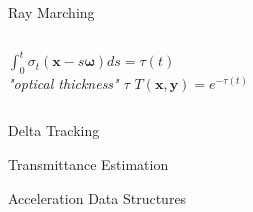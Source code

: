 \documentclass[
  english,            %
  aspectratio=169,    %
]{tumbeamer}
\newcommand\bx[0]{\textbf{x}}
\newcommand\by[0]{\textbf{y}}
\newcommand\bomega[0]{\boldsymbol{\omega}}
\begin{document}
\begin{frame}{Ray Marching}
\begin{columns}
    $\int_0^t \sigma_t(\bx-s\bomega)ds = \tau(t)$\\
        \textit{"optical thickness" $\tau$}
    $T(\bx, \by) = e^{-\tau(t)}$
\end{columns}
\end{frame}


\begin{frame}{Delta Tracking}
\end{frame}


\begin{frame}{Transmittance Estimation}
\end{frame}

\begin{frame}{Acceleration Data Structures}
\end{frame}

\maketitle
\end{document}
